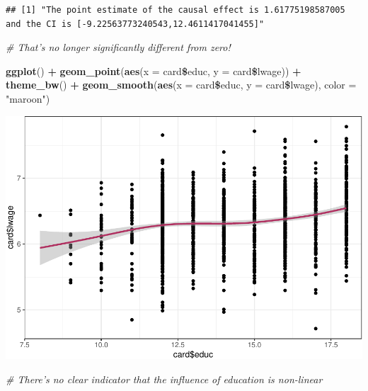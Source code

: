 \documentclass[]{article}
\newenvironment{Shaded}{\begin{snugshade}}{\end{snugshade}}
\newcommand{\KeywordTok}[1]{\textcolor[rgb]{0.13,0.29,0.53}{\textbf{#1}}}
\newcommand{\DataTypeTok}[1]{\textcolor[rgb]{0.13,0.29,0.53}{#1}}
\newcommand{\StringTok}[1]{\textcolor[rgb]{0.31,0.60,0.02}{#1}}
\newcommand{\CommentTok}[1]{\textcolor[rgb]{0.56,0.35,0.01}{\textit{#1}}}
\newcommand{\OperatorTok}[1]{\textcolor[rgb]{0.81,0.36,0.00}{\textbf{#1}}}
\newcommand{\NormalTok}[1]{#1}
\begin{document}
\begin{verbatim}
## [1] "The point estimate of the causal effect is 1.61775198587005 and the CI is [-9.22563773240543,12.4611417041455]"
\end{verbatim}

\begin{Shaded}
\begin{Highlighting}[]
\CommentTok{# That's no longer significantly different from zero!}
\end{Highlighting}
\end{Shaded}

\begin{Shaded}
\begin{Highlighting}[]
\KeywordTok{ggplot}\NormalTok{() }\OperatorTok{+}
\StringTok{  }\KeywordTok{geom_point}\NormalTok{(}\KeywordTok{aes}\NormalTok{(}\DataTypeTok{x =}\NormalTok{ card}\OperatorTok{\$}\NormalTok{educ, }\DataTypeTok{y =}\NormalTok{ card}\OperatorTok{\$}\NormalTok{lwage)) }\OperatorTok{+}\StringTok{ }\KeywordTok{theme_bw}\NormalTok{() }\OperatorTok{+}
\StringTok{  }\KeywordTok{geom_smooth}\NormalTok{(}\KeywordTok{aes}\NormalTok{(}\DataTypeTok{x =}\NormalTok{ card}\OperatorTok{\$}\NormalTok{educ, }\DataTypeTok{y =}\NormalTok{ card}\OperatorTok{\$}\NormalTok{lwage), }\DataTypeTok{color =} \StringTok{"maroon"}\NormalTok{)}
\end{Highlighting}
\end{Shaded}

\includegraphics{Assignment-6_files/figure-latex/unnamed-chunk-18-1.pdf}

\begin{Shaded}
\begin{Highlighting}[]
\CommentTok{# There's no clear indicator that the influence of education is non-linear}
\end{Highlighting}
\end{Shaded}
\end{document}
